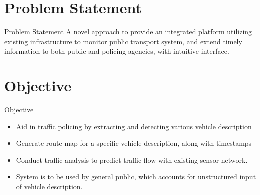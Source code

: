 \documentclass{beamer}
\begin{document}



\section{Problem Statement}
\begin{frame}{Problem Statement}
	A novel approach to provide an integrated platform utilizing existing infrastructure to monitor public transport system, and extend timely information to both public and policing agencies, with intuitive interface.
\end{frame}


\section{Objective}
\begin{frame}{Objective}
	\begin{itemize}
		\item Aid in traffic policing by extracting and detecting various vehicle description
		\item Generate route map for a specific vehicle description, along with timestamps
		\item Conduct traffic analysis to predict traffic flow with existing sensor network.
		\item System is to be used by general public, which accounts for unstructured input of vehicle description.
	\end{itemize}
\end{frame}
\end{document}
